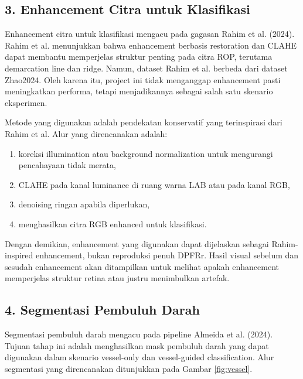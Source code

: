 \documentclass[12pt,a4paper]{article}
\begin{document}
\subsection*{3. Enhancement Citra untuk Klasifikasi}

Enhancement citra untuk klasifikasi mengacu pada gagasan Rahim et al. (2024). Rahim et al. menunjukkan bahwa enhancement berbasis restoration dan CLAHE dapat membantu memperjelas struktur penting pada citra ROP, terutama demarcation line dan ridge. Namun, dataset Rahim et al. berbeda dari dataset Zhao2024. Oleh karena itu, project ini tidak menganggap enhancement pasti meningkatkan performa, tetapi menjadikannya sebagai salah satu skenario eksperimen.

Metode yang digunakan adalah pendekatan konservatif yang terinspirasi dari Rahim et al. Alur yang direncanakan adalah:

\begin{enumerate}[label=\alph*.]
  \item koreksi illumination atau background normalization untuk mengurangi pencahayaan tidak merata,
  \item CLAHE pada kanal luminance di ruang warna LAB atau pada kanal RGB,
  \item denoising ringan apabila diperlukan,
  \item menghasilkan citra RGB enhanced untuk klasifikasi.
\end{enumerate}

Dengan demikian, enhancement yang digunakan dapat dijelaskan sebagai Rahim-inspired enhancement, bukan reproduksi penuh DPFRr. Hasil visual sebelum dan sesudah enhancement akan ditampilkan untuk melihat apakah enhancement memperjelas struktur retina atau justru menimbulkan artefak.

\subsection*{4. Segmentasi Pembuluh Darah}

Segmentasi pembuluh darah mengacu pada pipeline Almeida et al. (2024). Tujuan tahap ini adalah menghasilkan mask pembuluh darah yang dapat digunakan dalam skenario vessel-only dan vessel-guided classification. Alur segmentasi yang direncanakan ditunjukkan pada Gambar \ref{fig:vessel}.
\end{document}
